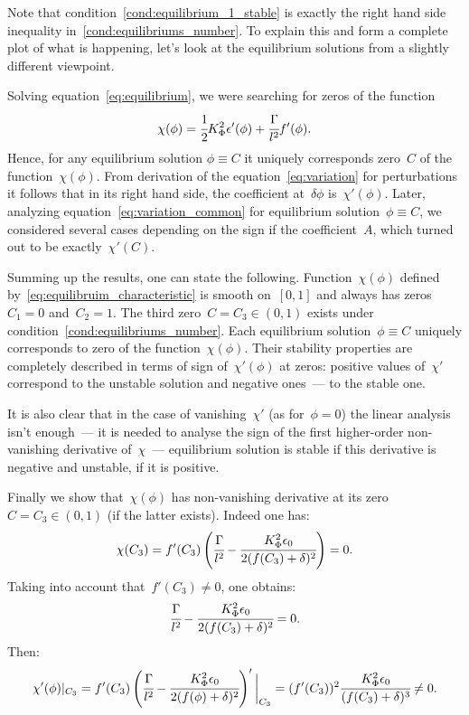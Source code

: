 Note that condition~\eqref{cond:equilibrium_1_stable} is exactly the
right hand side inequality in~\eqref{cond:equilibriums_number}.
To explain this and  form a complete plot of what is happening,
let's look at the equilibrium solutions from a slightly different
viewpoint.

Solving equation~\eqref{eq:equilibrium}, we were searching for zeros of
the function
\begin{equation}
	\chi(\phi) = \cfrac{1}{2} K_\Phi^2 \epsilon'(\phi) + \cfrac{\Gamma}{l^2} f'(\phi) {\text{.}}
	\label{eq:equilibruim_characteristic}
\end{equation}
Hence, for any equilibrium solution $\phi \equiv C$ it uniquely
corresponds zero~$C$ of the function~$\chi(\phi)$.
From derivation of the equation~\eqref{eq:variation} for perturbations
it follows that in its right hand side, the coefficient at~$\delta
\phi$ is~$\chi'(\phi)$.
Later, analyzing equation~\eqref{eq:variation_common} for equilibrium
solution~$\phi \equiv C$, we considered several cases depending on the
sign if the coefficient~$A$, which turned out to be exactly~$\chi'(C)$.


Summing up the results, one can state the following.
Function~$\chi(\phi)$ defined by~\eqref{eq:equilibruim_characteristic}
is smooth on~$[0, 1]$ and always has zeros~$C_1=0$ and~$C_2=1$.
The third zero~$C=C_3\in (0, 1)$ exists under
condition~\eqref{cond:equilibriums_number}.
Each equilibrium solution~$\phi \equiv C$ uniquely corresponds to zero
of the function~$\chi(\phi)$. Their stability properties are completely
described in terms of sign of~$\chi'(\phi)$ at zeros: positive
values of~$\chi'$
correspond to the unstable solution and negative ones~---
to the stable one.

It is also clear that in the case of vanishing~$\chi'$
(as for~$\phi = 0$) the linear analysis isn't enough~---
it is needed to analyse the sign of the first higher-order
non-vanishing
derivative of~$\chi$~--- equilibrium solution is stable if
this derivative is negative and unstable, if it is positive.


Finally we show that~$\chi(\phi)$ has non-vanishing derivative at its
zero~$C=C_3 \in (0, 1)$ (if the latter exists).
Indeed one has:
$$\chi(C_3) = f'(C_3) \left( \cfrac{\Gamma}{l^2} - \cfrac{K_\Phi^2 \epsilon_0}{2 (f(C_3) + \delta)^2} \right) = 0 {\text{.}}$$
Taking into account that~$f'(C_3) \ne 0$, one obtains:
$$\cfrac{\Gamma}{l^2} - \cfrac{K_\Phi^2 \epsilon_0}{2 (f(C_3) + \delta)^2} = 0 {\text{.}}$$
Then:
$$\chi'(\phi)|_{C_3} = f'(C_3) \left( \cfrac{\Gamma}{l^2} - \cfrac{K_\Phi^2 \epsilon_0}{2 (f(\phi) + \delta)^2} \right) ' \bigg|_{C_3} = (f'(C_3))^2 \cfrac{K_\Phi^2 \epsilon_0}{(f(C_3) + \delta)^3} \ne 0 {\text{.}}$$

